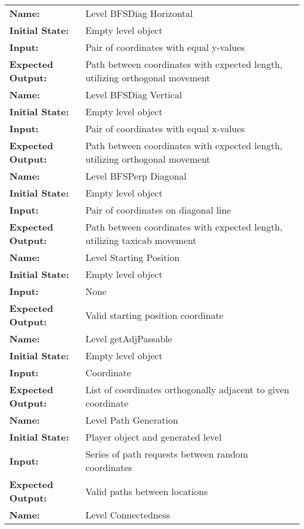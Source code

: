 \documentclass[12pt, titlepage]{article}
\begin{document}
\begin{center}
\begin{longtable}{ l | p{10cm} }
				\hline
				\textbf{Name:} & Level BFSDiag Horizontal\\
				\textbf{Initial State:} & Empty level object\\
				\textbf{Input:} & Pair of coordinates with equal y-values\\
				\textbf{Expected Output:} & Path between coordinates with expected length, utilizing orthogonal movement\\
				\hline
				\textbf{Name:} & Level BFSDiag Vertical\\
				\textbf{Initial State:} & Empty level object\\
				\textbf{Input:} & Pair of coordinates with equal x-values\\
				\textbf{Expected Output:} & Path between coordinates with expected length, utilizing orthogonal movement\\
				\hline
				\textbf{Name:} & Level BFSPerp Diagonal\\
				\textbf{Initial State:} & Empty level object\\
				\textbf{Input:} & Pair of coordinates on diagonal line\\
				\textbf{Expected Output:} & Path between coordinates with expected length, utilizing taxicab movement\\
				\hline
				\textbf{Name:} & Level Starting Position\\
				\textbf{Initial State:} & Empty level object\\
				\textbf{Input:} & None\\
				\textbf{Expected Output:} & Valid starting position coordinate\\
				\hline
				\textbf{Name:} & Level getAdjPassable\\
				\textbf{Initial State:} & Empty level object\\
				\textbf{Input:} & Coordinate\\
				\textbf{Expected Output:} & List of coordinates orthogonally adjacent to given coordinate\\
				\hline
				\textbf{Name:} & Level Path Generation\\
				\textbf{Initial State:} & Player object and generated level\\
				\textbf{Input:} & Series of path requests between random coordinates\\
				\textbf{Expected Output:} & Valid paths between locations\\
				\hline
				\textbf{Name:} & Level Connectedness\\

\end{longtable}
\end{center}
\end{document}
